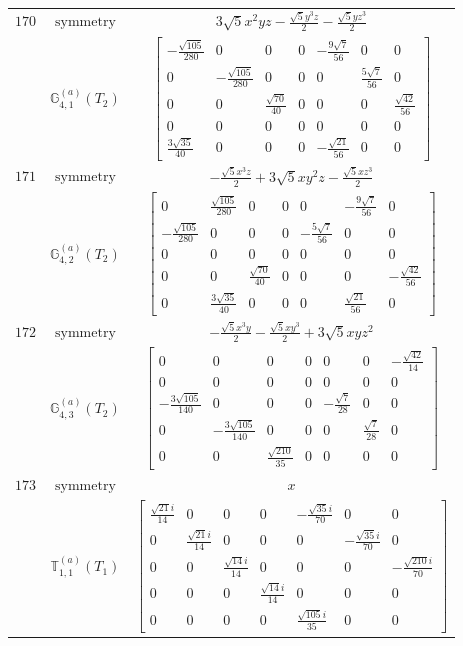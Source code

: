 \documentclass[fleqn,8pt,landscape]{jsarticle}
\begin{document}
\begin{longtable}{ccc}
$ 170 $ & $ \text{symmetry} $ & $ 3 \sqrt{5} x^{2} y z - \frac{\sqrt{5} y^{3} z}{2} - \frac{\sqrt{5} y z^{3}}{2} $ \\
$  $ & $ \mathbb{G}_{4,1}^{(a)}(T_{2}) $ & $ \begin{bmatrix} - \frac{\sqrt{105}}{280} & 0 & 0 & 0 & - \frac{9 \sqrt{7}}{56} & 0 & 0 \\ 0 & - \frac{\sqrt{105}}{280} & 0 & 0 & 0 & \frac{5 \sqrt{7}}{56} & 0 \\ 0 & 0 & \frac{\sqrt{70}}{40} & 0 & 0 & 0 & \frac{\sqrt{42}}{56} \\ 0 & 0 & 0 & 0 & 0 & 0 & 0 \\ \frac{3 \sqrt{35}}{40} & 0 & 0 & 0 & - \frac{\sqrt{21}}{56} & 0 & 0 \end{bmatrix} $ \\ \hline
$ 171 $ & $ \text{symmetry} $ & $ - \frac{\sqrt{5} x^{3} z}{2} + 3 \sqrt{5} x y^{2} z - \frac{\sqrt{5} x z^{3}}{2} $ \\
$  $ & $ \mathbb{G}_{4,2}^{(a)}(T_{2}) $ & $ \begin{bmatrix} 0 & \frac{\sqrt{105}}{280} & 0 & 0 & 0 & - \frac{9 \sqrt{7}}{56} & 0 \\ - \frac{\sqrt{105}}{280} & 0 & 0 & 0 & - \frac{5 \sqrt{7}}{56} & 0 & 0 \\ 0 & 0 & 0 & 0 & 0 & 0 & 0 \\ 0 & 0 & \frac{\sqrt{70}}{40} & 0 & 0 & 0 & - \frac{\sqrt{42}}{56} \\ 0 & \frac{3 \sqrt{35}}{40} & 0 & 0 & 0 & \frac{\sqrt{21}}{56} & 0 \end{bmatrix} $ \\ \hline
$ 172 $ & $ \text{symmetry} $ & $ - \frac{\sqrt{5} x^{3} y}{2} - \frac{\sqrt{5} x y^{3}}{2} + 3 \sqrt{5} x y z^{2} $ \\
$  $ & $ \mathbb{G}_{4,3}^{(a)}(T_{2}) $ & $ \begin{bmatrix} 0 & 0 & 0 & 0 & 0 & 0 & - \frac{\sqrt{42}}{14} \\ 0 & 0 & 0 & 0 & 0 & 0 & 0 \\ - \frac{3 \sqrt{105}}{140} & 0 & 0 & 0 & - \frac{\sqrt{7}}{28} & 0 & 0 \\ 0 & - \frac{3 \sqrt{105}}{140} & 0 & 0 & 0 & \frac{\sqrt{7}}{28} & 0 \\ 0 & 0 & \frac{\sqrt{210}}{35} & 0 & 0 & 0 & 0 \end{bmatrix} $ \\ \hline
$ 173 $ & $ \text{symmetry} $ & $ x $ \\
$  $ & $ \mathbb{T}_{1,1}^{(a)}(T_{1}) $ & $ \begin{bmatrix} \frac{\sqrt{21} i}{14} & 0 & 0 & 0 & - \frac{\sqrt{35} i}{70} & 0 & 0 \\ 0 & \frac{\sqrt{21} i}{14} & 0 & 0 & 0 & - \frac{\sqrt{35} i}{70} & 0 \\ 0 & 0 & \frac{\sqrt{14} i}{14} & 0 & 0 & 0 & - \frac{\sqrt{210} i}{70} \\ 0 & 0 & 0 & \frac{\sqrt{14} i}{14} & 0 & 0 & 0 \\ 0 & 0 & 0 & 0 & \frac{\sqrt{105} i}{35} & 0 & 0 \end{bmatrix} $ \\ \hline

\end{longtable}
\end{document}
